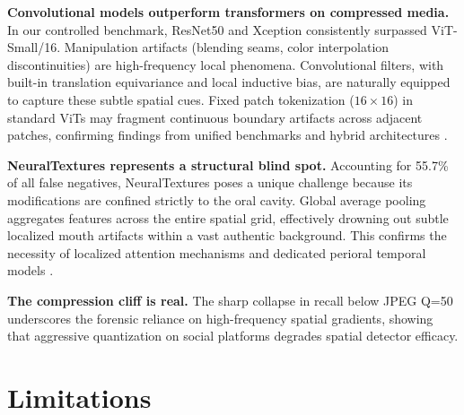\documentclass[conference]{IEEEtran}
\begin{document}
\textbf{Convolutional models outperform transformers on compressed media.} In our controlled benchmark, ResNet50 and Xception consistently surpassed ViT-Small/16. Manipulation artifacts (blending seams, color interpolation discontinuities) are high-frequency local phenomena. Convolutional filters, with built-in translation equivariance and local inductive bias, are naturally equipped to capture these subtle spatial cues. Fixed patch tokenization ($16 \times 16$) in standard ViTs may fragment continuous boundary artifacts across adjacent patches, confirming findings from unified benchmarks \cite{yan2023deepfakebench} and hybrid architectures \cite{coccomini2022crossefficientvit}.

\textbf{NeuralTextures represents a structural blind spot.} Accounting for 55.7\% of all false negatives, NeuralTextures poses a unique challenge because its modifications are confined strictly to the oral cavity. Global average pooling aggregates features across the entire spatial grid, effectively drowning out subtle localized mouth artifacts within a vast authentic background. This confirms the necessity of localized attention mechanisms \cite{zhao2021multiattentional} and dedicated perioral temporal models \cite{haliassos2021lips}.

\textbf{The compression cliff is real.} The sharp collapse in recall below JPEG Q=50 underscores the forensic reliance on high-frequency spatial gradients, showing that aggressive quantization on social platforms degrades spatial detector efficacy.


\section{Limitations}
\label{sec:limitations}
\end{document}

